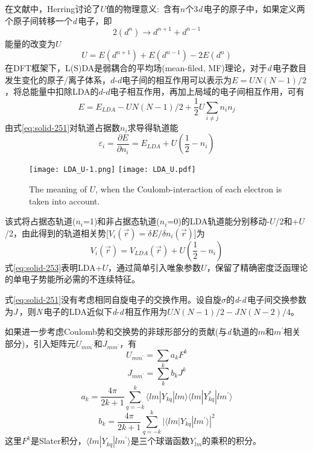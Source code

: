 在文献中，\textrm{Herring}讨论了$U$值的物理意义:~含有$n$个3{\textit d}\,电子的原子中，如果定义两个原子间转移一个{\textit d}\,电子，即
$$2(d^n)\rightarrow d^{n+1}+d^{n-1}$$
能量的改变为$U$
$$U=E(d^{n+1})+E(d^{n-1})-2E(d^n)$$
在\textrm{DFT}框架下，\textrm{L(S)DA}是弱耦合的平均场(\textrm{mean-filed, MF})理论，对于{\textit d}\,电子数目发生变化的原子/离子体系，$d$-$d$电子间的相互作用可以表示为$E=UN(N-1)/2$\cite{PRB48-16929_1993}，将总能量中扣除LDA的$d$-$d$电子相互作用，再加上局域的电子间相互作用，可有
\begin{equation}
  E=E_{LDA}-UN(N-1)/2+\frac12U\sum_{i\neq j}n_in_j
  \label{eq:solid-251}
\end{equation}
由式\eqref{eq:solid-251}对轨道占据数$n_i$求导得轨道能
\begin{equation}
  \varepsilon_i=\frac{\partial E}{\partial n_i}=E_{LDA}+U(\frac12-n_i)
  \label{eq:solid-252}
\end{equation}
\begin{figure}[h!]
\centering
\texttt{[image: LDA\_U-1.png]}
\texttt{[image: LDA\_U.pdf]}
\caption{\small \textrm{The meaning of $U$, when the Coulomb-interaction of each electron is taken into account.}}%
\label{Tetrahedron_weight}
\end{figure}
该式将占据态轨道($n_i$=1)和非占据态轨道($n_i$=0)的LDA轨道能分别移动-$U$/2和+$U$/2，由此得到的轨道相关势[$V_i(\vec r)=\delta E/\delta n_i(\vec r)$]为
\begin{equation}
  V_i(\vec r)=V_{LDA}(\vec r)+U(\frac12-n_i)
  \label{eq:solid-253}
\end{equation}
式\eqref{eq:solid-253}表明\textrm{LDA}+$U$，通过简单引入唯象参数$U$，保留了精确密度泛函理论的单电子势能所必需的不连续特征。

式\eqref{eq:solid-251}没有考虑相同自旋电子的交换作用。设自旋$\sigma$的{\textit d}-{\textit d}\,电子间交换参数为{\textit J}\,，则{\textit N}\,电子的LDA近似下{\textit d}-{\textit d}\,相互作用为$UN(N-1)/2-JN(N-2)/4$。

如果进一步考虑Coulomb势和交换势的非球形部分的贡献(与{\textit d}\,轨道的$m$和$m^{\prime}$相关部分)，引入矩阵元$U_{mm^{\prime}}$和$J_{mm^{\prime}}$，有
\begin{equation}
  U_{mm^{\prime}}=\sum_ka_kF^k
  \label{eq:solid-210}
\end{equation}
\begin{equation}
  J_{mm^{\prime}}=\sum_kb_kJ^k
  \label{eq:solid-211}
\end{equation}
\begin{equation}
  a_k=\frac{4\pi}{2k+1}\sum_{q=-k}^k\langle lm|Y_{kq}|lm\rangle\langle lm|Y_{kq}^{\ast}|lm^{\prime}\rangle
  \label{eq:solid-212}
\end{equation}
\begin{equation}
  b_k=\frac{4\pi}{2k+1}\sum_{q=-k}^k|\langle lm|Y_{kq}|lm^{\prime}\rangle|^2
  \label{eq:solid-213}
\end{equation}
这里$F^k$是Slater积分，$\langle lm|Y_{kq}|lm^{\prime}\rangle$是三个球谐函数$Y_{lm}$的乘积的积分。

